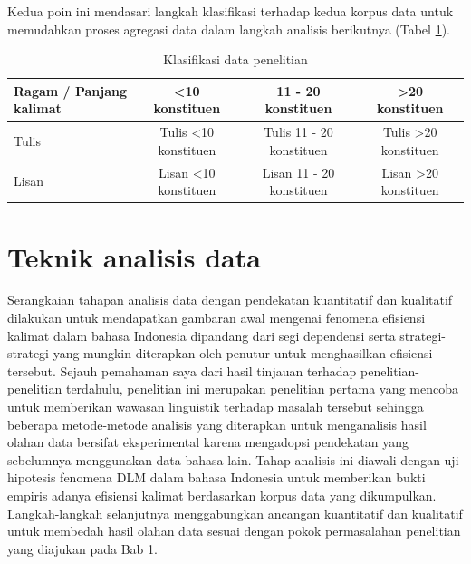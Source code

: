 Kedua poin ini mendasari langkah klasifikasi terhadap kedua korpus data untuk memudahkan proses agregasi data dalam langkah analisis berikutnya (Tabel \ref{tab:tabel_klasifikasi_data}). 

\begin{table}
\begin{footnotesize}
\begin{center}
  \caption{Klasifikasi data penelitian}\label{tab:tabel_klasifikasi_data}
  \begin{tabular}{ | p{3cm} | c | c | c |}
    \hline
    Ragam / Panjang kalimat & \textless 10 konstituen & 11 - 20 konstituen & \textgreater 20 konstituen \\ \hline
    Tulis & Tulis \textless 10 konstituen & Tulis 11 - 20 konstituen & Tulis \textgreater 20 konstituen  \\ \hline
    Lisan & Lisan \textless 10 konstituen & Lisan 11 - 20 konstituen & Lisan \textgreater 20 konstituen \\
    \hline
  \end{tabular}
\end{center}
\end{footnotesize}
\end{table}

\section{Teknik analisis data}

Serangkaian tahapan analisis data dengan pendekatan kuantitatif dan kualitatif dilakukan untuk mendapatkan gambaran awal mengenai fenomena efisiensi kalimat dalam bahasa Indonesia dipandang dari segi dependensi serta strategi-strategi yang mungkin diterapkan oleh penutur untuk menghasilkan efisiensi tersebut. Sejauh pemahaman saya dari hasil tinjauan terhadap penelitian-penelitian terdahulu, penelitian ini merupakan penelitian pertama yang mencoba untuk memberikan wawasan linguistik terhadap masalah tersebut sehingga beberapa metode-metode analisis yang diterapkan untuk menganalisis hasil olahan data bersifat eksperimental karena mengadopsi pendekatan yang sebelumnya menggunakan data bahasa lain. Tahap analisis ini diawali dengan uji hipotesis fenomena DLM dalam bahasa Indonesia untuk memberikan bukti empiris adanya efisiensi kalimat berdasarkan korpus data yang dikumpulkan. Langkah-langkah selanjutnya menggabungkan ancangan kuantitatif dan kualitatif untuk membedah hasil olahan data sesuai dengan pokok permasalahan penelitian yang diajukan pada Bab 1.

